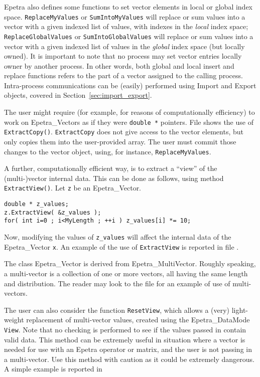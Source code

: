 Epetra also defines some functions to set vector elements in local or
global index space.  \verb!ReplaceMyValues! or \verb!SumIntoMyValues!
will replace or sum values into a vector with a given indexed list of
values, with indexes in the {\em local} index space;
\verb!ReplaceGlobalValues! or \verb!SumIntoGlobalValues! will replace or
sum values into a vector with a given indexed list of values in the {\em
  global} index space (but locally owned). It is important to note that
no process may set vector entries locally owner by another process. In
other words, both global and local insert and replace functions refers
to the part of a vector assigned to the calling process. Intra-process
communications can be (easily) performed using Import and Export
objects, covered in Section~\ref{sec:import_export}.

The user might require (for example, for reasons of computationally
efficiency) to work on Epetra\_Vectors as if they were \verb!double *!
pointers.  File 
\newline
{} 
\newline
shows the use of \verb!ExtractCopy()!.
\verb!ExtractCopy! does not give access to the vector elements, but only
copies them into the user-provided array.  The user must commit those
changes to the vector object, using, for instance,
\verb!ReplaceMyValues!.

A further, computationally efficient way, is to extract a ``view'' of the
(multi-)vector internal data.  This can be done as follows, using method
\verb!ExtractView()!. Let \verb!z! be an Epetra\_Vector. 
\begin{verbatim}
double * z_values;
z.ExtractView( &z_values );
for( int i=0 ; i<MyLength ; ++i ) z_values[i] *= 10;
\end{verbatim}
Now, modifying the values of \verb!z_values! will affect the internal
data of the Epetra\_Vector \verb!x!.  An example of the use of
\verb!ExtractView! is reported in file \newline {}.

\begin{remark}
  The class Epetra\_Vector is derived from Epetra\_MultiVector. Roughly
  speaking, a multi-vector is a collection of one or more vectors, all
  having the same length and distribution. The reader may look to the
  file  for an example of use of multi-vectors.
\end{remark}

The user can also consider the function \verb!ResetView!, which allows a
(very) light-weight replacement of multi-vector values, created using
the Epetra\_DataMode \verb!View!. Note that no checking is performed to
see if the values passed in contain valid data. This method can be
extremely useful in situation where a vector is needed for use with an
Epetra operator or matrix, and the user is not passing in a
multi-vector. Use this method with caution as it could be extremely
dangerous.
A simple example is reported in \newline {}

